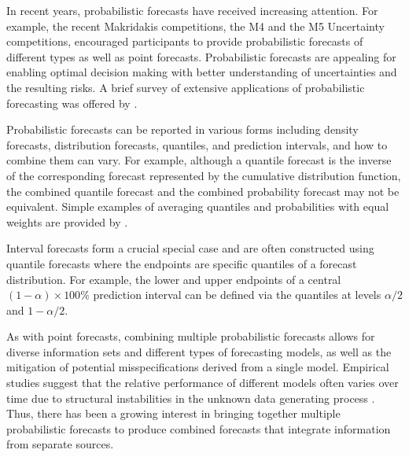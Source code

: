 \documentclass[11pt]{article}
\begin{document}
In recent years, probabilistic forecasts have received increasing attention. For example, the recent Makridakis competitions, the M4 and the M5 Uncertainty \citep{Makridakis2020-lz} competitions, encouraged participants to provide probabilistic forecasts of different types as well as point forecasts. Probabilistic forecasts are appealing for enabling optimal decision making with better understanding of uncertainties and the resulting risks. A brief survey of extensive applications of probabilistic forecasting was offered by \citet{Gneiting2014-tz}.

Probabilistic forecasts can be reported in various forms including density forecasts, distribution forecasts, quantiles, and prediction intervals, and how to combine them can vary. For example, although a quantile forecast is the inverse of the corresponding forecast represented by the cumulative distribution function, the combined quantile forecast and the combined probability forecast may not be equivalent. Simple examples of averaging quantiles and probabilities with equal weights are provided by \citet{Lichtendahl2013-rt}. 

Interval forecasts form a crucial special case and are often constructed using quantile forecasts where the endpoints are specific quantiles of a forecast distribution. For example, the lower and upper endpoints of a central $(1-\alpha)\times 100\%$ prediction interval can be defined via the quantiles at levels $\alpha/2$ and $1-\alpha/2$.

As with point forecasts, combining multiple probabilistic forecasts allows for  diverse information sets and different types of forecasting models, as well as the mitigation of potential misspecifications derived from a single model. Empirical studies suggest that the relative performance of different models often varies over time due to structural instabilities in the unknown data generating process \citep[e.g.,][]{Billio2013-sg}. Thus, there has been a growing interest in bringing together multiple probabilistic forecasts to produce combined forecasts that integrate information from separate sources.
\end{document}
